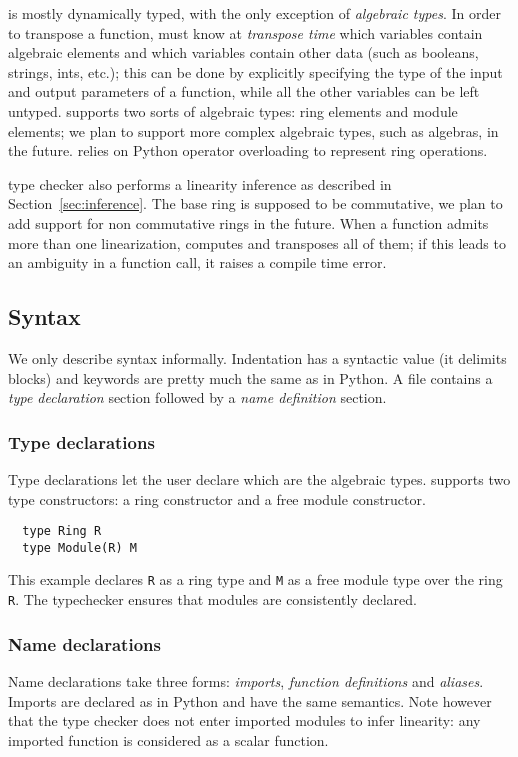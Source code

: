 \tALpy{} is mostly dynamically typed, with the only exception of
\emph{algebraic types}. In order to transpose a function, \tALpy{}
must know at \emph{transpose time} which variables contain algebraic
elements and which variables contain other data (such as booleans,
strings, ints, etc.); this can be done by explicitly specifying the
type of the input and output parameters of a function, while all the
other variables can be left untyped. \tALpy{} supports two sorts of
algebraic types: ring elements and module elements; we plan to support
more complex algebraic types, such as algebras, in the
future. \tALpy{} relies on Python operator overloading to represent
ring operations.

\tALpy{} type checker also performs a linearity inference as described
in Section~\ref{sec:inference}. The base ring is supposed to be
commutative, we plan to add support for non commutative rings in the
future. When a function admits more than one linearization, \tALpy{}
computes and transposes all of them; if this leads to an ambiguity in
a function call, it raises a compile time error.


\subsection{Syntax}
\label{sec:syntax}
We only describe \tALpy{} syntax informally. Indentation has a
syntactic value (it delimits blocks) and keywords are pretty much the
same as in Python. A \tALpy{} file contains a \emph{type declaration}
section followed by a \emph{name definition} section.

\subsubsection{Type declarations}
Type declarations let the user declare which are the algebraic types.
\tALpy{} supports two type constructors: a ring constructor and a free
module constructor.

\begin{lstlisting}
  type Ring R
  type Module(R) M
\end{lstlisting}

This example declares \lstinline+R+ as a ring type and \lstinline+M+
as a free module type over the ring \lstinline+R+. The typechecker
ensures that modules are consistently declared.


\subsubsection{Name declarations}
Name declarations take three forms: \emph{imports}, \emph{function
  definitions} and \emph{aliases}. Imports are declared as in Python
and have the same semantics. Note however that the type checker does
not enter imported modules to infer linearity: any imported function
is considered as a scalar function.

